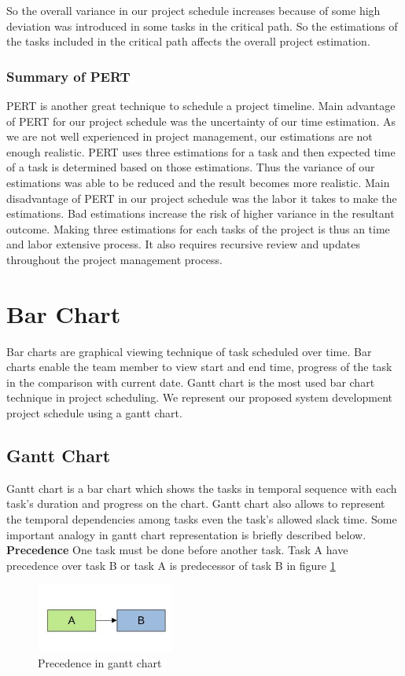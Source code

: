 \begin{spacing}{1}
So the overall variance in our project schedule increases because of some high deviation was introduced in some tasks in the critical path. So the estimations of the tasks included in the critical path affects the overall project estimation.

\subsubsection{Summary of PERT}
PERT is another great technique to schedule a project timeline. Main advantage of PERT for our project schedule was the uncertainty of our time estimation. As we are not well experienced in project management, our estimations are not enough realistic. PERT uses three estimations for a task and then expected time of a task is determined based on those estimations. Thus the variance of our estimations was able to be reduced and the result becomes more realistic. 
Main disadvantage of PERT in our project schedule was the labor it takes to make the estimations. Bad estimations increase the risk of higher variance in the resultant outcome. Making three estimations for each tasks of the project is thus an time and labor extensive process. It also requires recursive review and updates throughout the project management process.

\section{Bar Chart}
Bar charts are graphical viewing technique of task scheduled over time. Bar charts enable the team member to view start and end time, progress of the task in the comparison with current date. Gantt chart is the most used bar chart technique in project scheduling. We represent our proposed system development project schedule using a gantt chart. 
\subsection{Gantt Chart}
 Gantt chart is a bar chart which shows the tasks in temporal sequence with each task's duration and progress on the chart. Gantt chart also allows to represent the temporal dependencies among tasks even the task's allowed slack time. Some important analogy in gantt chart representation is briefly described below.
 \textbf{Precedence}\newline
 One task must be done before another task. Task A have precedence over task B or task A is predecessor of task B in figure \ref{fig:pecedence}
 \begin{figure}[h]
 	\centering
 	\includegraphics[width=0.4\textwidth]{Precedence}
 	\caption{Precedence in gantt chart}
 	\label{fig:pecedence}
 \end{figure} 


\end{spacing}
